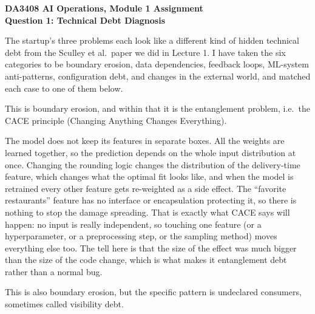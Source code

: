 \documentclass[11pt,a4paper]{article}
\newcommand{\qhead}[1]{\vspace{8pt}{\large\bfseries #1}\par\vspace{-2pt}}
\newcommand{\shead}[1]{\vspace{4pt}{\bfseries #1}\par\vspace{-3pt}}
\begin{document}
\pagestyle{plain}

\begin{center}
{\large\bfseries DA3408 AI Operations, Module 1 Assignment}\\[3pt]
{\bfseries Question 1: Technical Debt Diagnosis}
\end{center}
\vspace{6pt}

The startup's three problems each look like a different kind of hidden technical debt from the Sculley
et al.\ paper we did in Lecture 1. I have taken the six categories to be boundary erosion, data
dependencies, feedback loops, ML-system anti-patterns, configuration debt, and changes in the external
world, and matched each case to one of them below.

\qhead{Part 1: Which category explains each case}

\shead{(a) Changing the rounding of ``estimated delivery time'' broke ``favorite restaurants''}

This is boundary erosion, and within that it is the entanglement problem, i.e.\ the CACE principle
(Changing Anything Changes Everything).

The model does not keep its features in separate boxes. All the weights are learned together, so the
prediction depends on the whole input distribution at once. Changing the rounding logic changes the
distribution of the delivery-time feature, which changes what the optimal fit looks like, and when the
model is retrained every other feature gets re-weighted as a side effect. The ``favorite restaurants''
feature has no interface or encapsulation protecting it, so there is nothing to stop the damage
spreading. That is exactly what CACE says will happen: no input is really independent, so touching one
feature (or a hyperparameter, or a preprocessing step, or the sampling method) moves everything else
too. The tell here is that the size of the effect was much bigger than the size of the code change,
which is what makes it entanglement debt rather than a normal bug.

\shead{(b) A marketing dashboard reading the model's output table without anyone knowing}

This is also boundary erosion, but the specific pattern is undeclared consumers, sometimes called
visibility debt.
\end{document}
